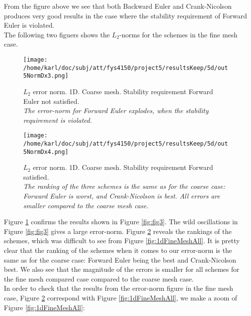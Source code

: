 \documentclass{article}
\begin{document}
From the figure above we see that both Backward Euler and Crank-Nicolson produces very good results in the case where the stability requirement of Forward Euler is violated.\\

The following two figuers shows the $L_2$-norms for the schemes in the fine mesh case.

\begin{minipage}{.45\textwidth} 
	\begin{figure}[H]
		\centering
		\texttt{[image: /home/karl/doc/subj/att/fys4150/project5/resultsKeep/5d/out5NormDx3.png]}
		\caption{$L_2$ error norm. 1D. Coarse mesh. Stability requirement Forward Euler not satisfied.\\ \textit{The error-norm for Forward Euler explodes, when the stability requirement is violated.}}
		\label{fig:l23}
	\end{figure}
\end{minipage}\hfill
\begin{minipage}{.45\textwidth} 
	\begin{figure}[H]
		\centering
		\texttt{[image: /home/karl/doc/subj/att/fys4150/project5/resultsKeep/5d/out5NormDx4.png]}
		\caption{$L_2$ error norm. 1D. Coarse mesh. Stability requirement Forward satisfied.\\ \textit{The ranking of the three schemes is the same as for the coarse case: Forward Euler is worst, and Crank-Nicolson is best. All errors are smaller compared to the coarse mesh case.}}
		\label{fig:l24}
	\end{figure}
\end{minipage}\hfill
\vspace{2ex}

Figure \ref{fig:l23} confirms the results shown in Figure \ref{fig:fig3}. The wild oscillations in Figure \ref{fig:fig3} gives a large error-norm. Figure \ref{fig:l24} reveals the rankings of the schemes, which was difficult to see from Figure \ref{fig:1dFineMeshAll}. It is pretty clear that the ranking of the schemes when it comes to our error-norm is the same as for the coarse case: Forward Euler being the best and Crank-Nicolson best. We also see that the magnitude of the errors is smaller for all schemes for the fine mesh compared case compared to the coarse mesh case.\\

In order to check that the results from the error-norm figure in the fine mesh case, Figure \ref{fig:l24} correspond with Figure \ref{fig:1dFineMeshAll}, we make a zoom of Figure \ref{fig:1dFineMeshAll}:
\end{document}
